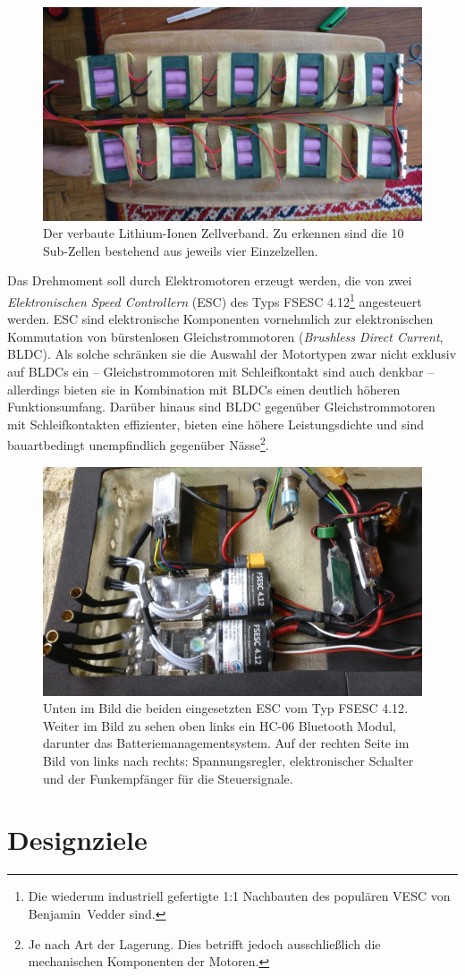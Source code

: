 		\begin{figure}[h]
			\centering
			\includegraphics[width=.9\textwidth]{Footage/Pictures/Battery pack.jpg}
			\caption[Der verbaute Lithium-Ionen Zellverband]{Der verbaute Lithium-Ionen Zellverband. Zu erkennen sind die 10 Sub-Zellen bestehend aus jeweils vier Einzelzellen.}
			\label{fig:battery pack}
		\end{figure}\par
		Das Drehmoment soll durch Elektromotoren erzeugt werden, die von zwei \textit{Elektronischen Speed Controllern} (ESC) des Typs \textsc{FSESC 4.12}\footnote{Die wiederum industriell gefertigte 1:1 Nachbauten des populären \textsc{VESC} von Benjamin~Vedder sind.} angesteuert werden.
		ESC sind elektronische Komponenten vornehmlich zur elektronischen Kommutation von bürstenlosen Gleichstrommotoren (\textit{Brushless Direct Current}, BLDC).
		Als solche schränken sie die Auswahl der Motortypen zwar nicht exklusiv auf BLDCs ein -- Gleichstrommotoren mit Schleifkontakt sind auch denkbar -- allerdings bieten sie in Kombination mit BLDCs einen deutlich höheren Funktionsumfang.
		Darüber hinaus sind BLDC gegenüber Gleichstrommotoren mit Schleifkontakten effizienter, bieten eine höhere Leistungsdichte und sind bauartbedingt unempfindlich gegenüber Nässe\footnote{Je nach Art der Lagerung. Dies betrifft jedoch ausschließlich die mechanischen Komponenten der Motoren.}.
		\begin{figure}[h]
			\centering
			\includegraphics[width=.9\textwidth]{Footage/Pictures/Electronics.jpg}
			\caption[Eingesetzte ESC]{Unten im Bild die beiden eingesetzten ESC vom Typ \textsc{FSESC 4.12}. Weiter im Bild zu sehen oben links ein HC-06 Bluetooth Modul, darunter das Batteriemanagementsystem. Auf der rechten Seite im Bild von links nach rechts: Spannungsregler, elektronischer Schalter und der Funkempfänger für die Steuersignale.}
			\label{fig:electronics}
		\end{figure}
	\section{Designziele}
